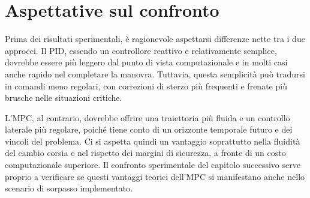 \section{Aspettative sul confronto}

Prima dei risultati sperimentali, è ragionevole aspettarsi differenze nette tra i due approcci. Il PID, essendo un controllore reattivo e relativamente semplice, dovrebbe essere più leggero dal punto di vista computazionale e in molti casi anche rapido nel completare la manovra. Tuttavia, questa semplicità può tradursi in comandi meno regolari, con correzioni di sterzo più frequenti e frenate più brusche nelle situazioni critiche.

L'MPC, al contrario, dovrebbe offrire una traiettoria più fluida e un controllo laterale più regolare, poiché tiene conto di un orizzonte temporale futuro e dei vincoli del problema. Ci si aspetta quindi un vantaggio soprattutto nella fluidità del cambio corsia e nel rispetto dei margini di sicurezza, a fronte di un costo computazionale superiore. Il confronto sperimentale del capitolo successivo serve proprio a verificare se questi vantaggi teorici dell'MPC si manifestano anche nello scenario di sorpasso implementato.
